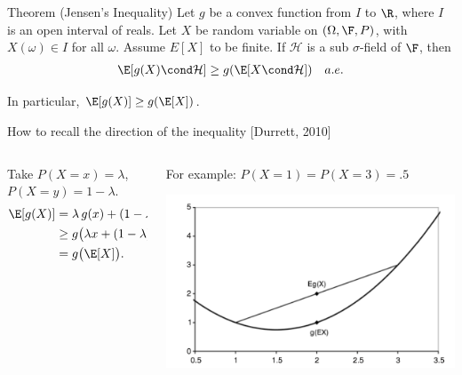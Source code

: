 \documentclass[10pt]{beamer}
\begin{document}
\begin{frame}


\begin{block}{Theorem (Jensen's Inequality)}
Let $g$ be a convex function from $I$ to $\R$, where $I$ is an open interval of reals.  Let $X$ be random variable on $(\Omega, \F, P)$, with $X(\omega) \in I$ for all $\omega$.  Assume $E[X]$ to be finite. If $\mathcal{H}$ is a sub $\sigma$-field of $\F$, then 
%
\begin{align}
\E[g(X) \cond \mathcal{H}] \geq g(\E[X \cond \mathcal{H}]) \quad a.e. 
\label{eqn:jensens_inequality_for_conditional_expectations}	
\end{align}  

In particular, $\E[g(X)] \geq g(\E[X])$.
\label{thm:jensens_inequality}	
\end{block}

\vfill 
\pause 
\begin{block}{How to recall the direction of the inequality {\small [Durrett, 2010]}}

\vskip 0.1in

\begin{columns}
\begin{column}{0.6\textwidth}
{\small
Take $P(X=x) = \lambda$, $P(X=y) = 1-\lambda$.
\begin{align*}
	\E[g(X)] &= \lambda \, g(x) + (1-\lambda) \, g(y) && \tinytext{LOTUS} \\
	& \geq  g \big(\lambda x  + (1-\lambda) y  \big) && \tinytext{def. convexity}\\
		&= g \big( \E[X] \big). && \tinytext{def. expectation} 
\end{align*}
}
\end{column}
\vrule{}
\begin{column}{0.32\textwidth}
    {\scriptsize For example: $P(X=1) = P(X=3) = .5$ } 
    \begin{center}
     \includegraphics[width=\textwidth]{images/jensens_inequality_per_durrett}  
     \end{center}
\end{column}
%
\end{columns}
\end{block}

\end{frame}
\end{document}
